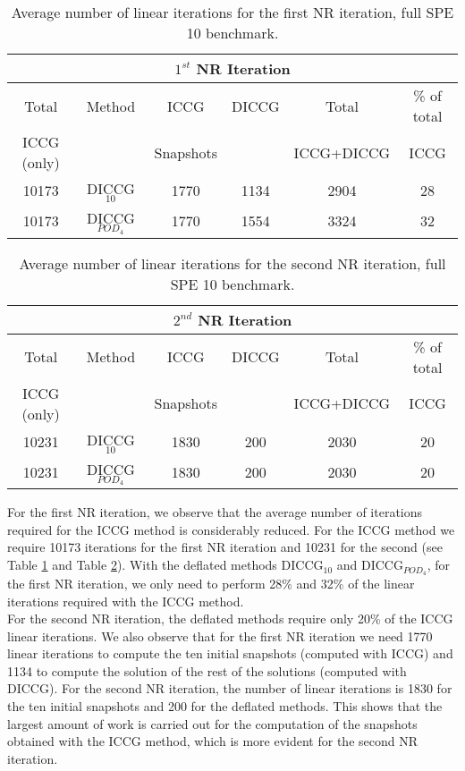 \documentclass[12pt]{article}
\numberwithin{equation}{section}
\begin{document}
\begin{table}[!ht]\centering
\begin{minipage}{1\textwidth}
\vspace{-10pt}
\centering
\begin{tabular}{ ||c||c|c|c|c|c||} 
  \hline
   \multicolumn{6}{|c|}{$1^{st}$ NR Iteration}  \\
\hline
Total& Method &ICCG &DICCG &Total&\% of total\\
ICCG (only)   &  & Snapshots& &ICCG+DICCG& ICCG\\
\hline

10173&DICCG$_{10}$&1770&1134&2904&28 \\
10173 &DICCG$_{POD_4}$&1770&1554&3324&32  \\
\hline
 \end{tabular}
\caption{Average number of linear iterations for the first NR iteration, full SPE 10 benchmark.}\label{table:literspe1}
\end{minipage}
\end{table}
\begin{table}[!ht]\centering
\begin{minipage}{1\textwidth}
\vspace{-10pt}
\centering
\begin{tabular}{ ||c||c|c|c|c|c||} 
  \hline
   \multicolumn{6}{|c|}{$2^{nd}$ NR Iteration}  \\
\hline
Total& Method & ICCG&DICCG &Total&\% of total\\
ICCG (only)   &  & Snapshots& &ICCG+DICCG& ICCG\\
\hline
10231&DICCG$_{10}$&1830&200&2030&20 \\
10231 &DICCG$_{POD_4}$&1830&200&2030&20 \\

\hline
 \end{tabular}
\caption{Average number of linear iterations for the second NR iteration, full SPE 10 benchmark.}\label{table:literspe2}
\end{minipage}
\end{table}
For the first NR iteration, we observe that the average number of iterations required for the ICCG method  is considerably reduced. For the ICCG method we require 10173 iterations for the first NR iteration and 10231 for the second (see Table \ref{table:literspe1} and Table \ref{table:literspe2}). With the deflated methods DICCG$_{10}$ and DICCG$_{POD_4}$, for the first NR iteration, we only need to perform 28\% and 32\% of the linear iterations required with the ICCG method.\\
For the second NR iteration, the deflated methods require only 20\% of the ICCG linear iterations. 
We also observe that for the first NR iteration we need 1770 linear iterations to compute the ten initial snapshots (computed with ICCG) and 1134 to compute the solution of the rest of the solutions (computed with DICCG). For the second NR iteration, the number of linear iterations is 1830 for the ten initial snapshots and 200 for the deflated methods. This shows that the largest amount of work is carried out for the computation of the snapshots obtained with the ICCG method, which is more evident for the second NR iteration.
\end{document}
